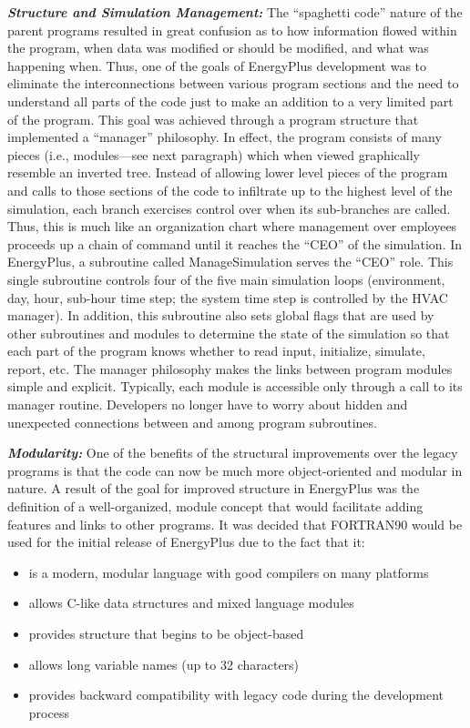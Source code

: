 \textbf{\emph{Structure and Simulation Management:}} The ``spaghetti code'' nature of the parent programs resulted in great confusion as to how information flowed within the program, when data was modified or should be modified, and what was happening when. Thus, one of the goals of EnergyPlus development was to eliminate the interconnections between various program sections and the need to understand all parts of the code just to make an addition to a very limited part of the program. This goal was achieved through a program structure that implemented a ``manager'' philosophy. In effect, the program consists of many pieces (i.e., modules---see next paragraph) which when viewed graphically resemble an inverted tree. Instead of allowing lower level pieces of the program and calls to those sections of the code to infiltrate up to the highest level of the simulation, each branch exercises control over when its sub-branches are called. Thus, this is much like an organization chart where management over employees proceeds up a chain of command until it reaches the ``CEO'' of the simulation. In EnergyPlus, a subroutine called ManageSimulation serves the ``CEO'' role. This single subroutine controls four of the five main simulation loops (environment, day, hour, sub-hour time step; the system time step is controlled by the HVAC manager). In addition, this subroutine also sets global flags that are used by other subroutines and modules to determine the state of the simulation so that each part of the program knows whether to read input, initialize, simulate, report, etc. The manager philosophy makes the links between program modules simple and explicit. Typically, each module is accessible only through a call to its manager routine. Developers no longer have to worry about hidden and unexpected connections between and among program subroutines.

\textbf{\emph{Modularity:}} One of the benefits of the structural improvements over the legacy programs is that the code can now be much more object-oriented and modular in nature. A result of the goal for improved structure in EnergyPlus was the definition of a well-organized, module concept that would facilitate adding features and links to other programs. It was decided that FORTRAN90 would be used for the initial release of EnergyPlus due to the fact that it:

\begin{itemize}
\item
  is a modern, modular language with good compilers on many platforms
\item
  allows C-like data structures and mixed language modules
\item
  provides structure that begins to be object-based
\item
  allows long variable names (up to 32 characters)
\item
  provides backward compatibility with legacy code during the development process
\end{itemize}

